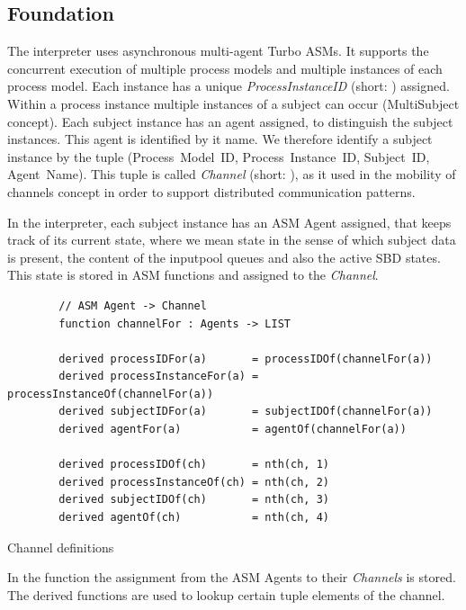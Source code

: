 \subsection{Foundation}

The interpreter uses asynchronous multi-agent Turbo ASMs.
It supports the concurrent execution of multiple process models and multiple instances of each process model.
Each instance has a unique \textit{ProcessInstanceID} (short: ) assigned.
Within a process instance multiple instances of a subject can occur (MultiSubject concept).
Each subject instance has an agent assigned, to distinguish the subject instances.
This agent is identified by it name.
We therefore identify a subject instance by the tuple (Process~Model~ID, Process~Instance~ID, Subject~ID, Agent~Name).
This tuple is called \textit{Channel} (short: ), as it used in the mobility of channels concept in order to support distributed communication patterns.

In the interpreter, each subject instance has an ASM Agent assigned, that keeps track of its current state,
where we mean state in the sense of which subject data is present, the content of the inputpool queues and also the active SBD states.
This state is stored in ASM functions and assigned to the \textit{Channel}.

\begin{listing}[H]
	\begin{verbatim}
		// ASM Agent -> Channel
		function channelFor : Agents -> LIST
		
		derived processIDFor(a)       = processIDOf(channelFor(a))
		derived processInstanceFor(a) = processInstanceOf(channelFor(a))
		derived subjectIDFor(a)       = subjectIDOf(channelFor(a))
		derived agentFor(a)           = agentOf(channelFor(a))
		
		derived processIDOf(ch)       = nth(ch, 1)
		derived processInstanceOf(ch) = nth(ch, 2)
		derived subjectIDOf(ch)       = nth(ch, 3)
		derived agentOf(ch)           = nth(ch, 4)
	\end{verbatim}
	\caption{Channel definitions}
	\label{lst:shortasm:channelFor}
\end{listing}

In the function  the assignment from the ASM Agents to their \textit{Channels} is stored. The derived functions are used to lookup certain tuple elements of the channel.


